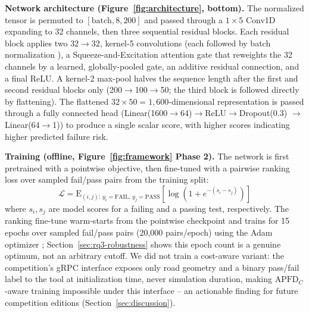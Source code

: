 \documentclass[smallextended]{svjour3}
\begin{document}
\textbf{Network architecture (Figure~\ref{fig:architecture}, bottom).} The
normalized tensor is permuted to $[\text{batch},8,200]$ and passed through
a $1{\times}5$ Conv1D expanding to 32 channels, then three sequential
residual blocks. Each residual block applies two $32{\to}32$, kernel-5
convolutions (each followed by batch normalization \citep{ioffe2015batch}),
a Squeeze-and-Excitation attention gate \citep{hu2018squeeze} that
reweights the 32 channels by a learned, globally-pooled gate, an additive
residual connection, and a final ReLU. A kernel-2 max-pool halves the
sequence length after the first and second residual blocks only
(200$\to$100$\to$50; the third block is followed directly by flattening).
The flattened $32\times50=1{,}600$-dimensional representation is passed
through a fully connected head (Linear(1600$\to$64)$\to$ReLU$\to$Dropout(0.3)
\citep{srivastava2014dropout}$\to$Linear(64$\to$1)) to produce a single
scalar score, with higher scores indicating higher predicted failure risk.

\textbf{Training (offline, Figure~\ref{fig:framework} Phase 2).} The network
is first pretrained with a pointwise objective, then fine-tuned with a
pairwise ranking loss over sampled fail/pass pairs from the training split:
\begin{equation}
\mathcal{L} = \mathrm{E}_{(i,j):\,y_i=\text{FAIL},\,y_j=\text{PASS}}\left[\log\left(1+e^{-(s_i-s_j)}\right)\right]
\end{equation}
where $s_i,s_j$ are model scores for a failing and a passing test,
respectively. The ranking fine-tune warm-starts from the pointwise
checkpoint and trains for 15 epochs over sampled fail/pass pairs
(20{,}000 pairs/epoch) using the Adam optimizer \citep{kingma2014adam};
Section~\ref{sec:rq3-robustness} shows this epoch
count is a genuine optimum, not an arbitrary cutoff. We did not train a
cost-aware variant: the competition's gRPC interface exposes only road
geometry and a binary pass/fail label to the tool at initialization time,
never simulation duration, making $\mathrm{APFD}_C$-aware training
impossible under this interface -- an actionable finding for future
competition editions (Section~\ref{sec:discussion}).
\end{document}
